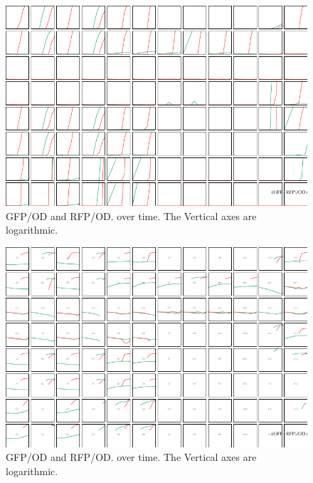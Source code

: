 \documentclass[11pt]{book}
\begin{document}
\begin{figure}[h]
\includegraphics[scale=1.7, angle=-90, origin=c]{GfpPlusRfpByODCorrectedYMax80000.pdf}
\caption{
GFP/OD and RFP/OD. over time. The Vertical axes are logarithmic.}
\label{fig:GfpRfpByOD}
\end{figure}



\pagebreak

\begin{figure}[h]
\includegraphics[scale=1.7, angle=-90, origin=c]{LogGfpPlusRfpByODCorrectedYMax12.pdf}
\caption{
GFP/OD and RFP/OD. over time. The Vertical axes are logarithmic.}
\label{fig:GfpRfpByODLog}
\end{figure}
\end{document}
